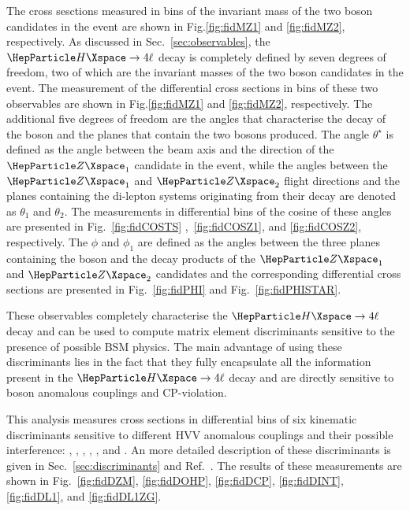 The cross sesctions measured in bins of the invariant mass of the two \PZ boson candidates in the event are shown in Fig.\ref{fig:fidMZ1} and \ref{fig:fidMZ2}, respectively.
As discussed in Sec.~\ref{sec:observables}, the $\Hllll$ decay is completely defined by seven degrees of freedom, two of which are the invariant masses of the two \PZ boson candidates in the event. The measurement of the differential cross sections in bins of these two observables are shown in Fig.\ref{fig:fidMZ1} and \ref{fig:fidMZ2}, respectively.
The additional five degrees of freedom are the angles that characterise the decay of the \PH boson and the planes that contain the two \PZ bosons produced. 
The angle $\theta^\star$ is defined as the angle between the beam axis and the direction of the $\PZ_1$ candidate in the event, while the angles between the $\PZ_1$ and $\PZ_2$ flight directions and the planes containing the di-lepton systems originating from their decay are denoted as  $\theta_1$ and $\theta_2$.
The measurements in differential bins of the cosine of these angles are presented in Fig.~\ref{fig:fidCOSTS} ,~\ref{fig:fidCOSZ1}, and \ref{fig:fidCOSZ2}, respectively.
The $\phi$ and $\phi_1$ are defined as the angles between the three planes containing the \PH boson and the decay products of the $\PZ_1$ and $\PZ_2$ candidates and the corresponding differential cross sections are presented in Fig.~\ref{fig:fidPHI} and Fig.~\ref{fig:fidPHISTAR}. 

These observables completely characterise the $\Hllll$ decay and can be used to compute matrix element discriminants sensitive to the presence of possible BSM physics. The main advantage of using these discriminants lies in the fact that they fully encapsulate all the information present in the $\Hllll$ decay and are directly sensitive to \PH boson anomalous couplings and CP-violation.

This analysis measures cross sections in differential bins of six kinematic discriminants sensitive to different HVV anomalous couplings and their possible interference: \Dzm, \Dzhp, \DCP, \Dint, \DLone, and \DLoneZg. An more detailed description of these discriminants is given in Sec.~\ref{sec:discriminants} and Ref.~\cite{CMSHIG19009}.
The results of these measurements are shown in Fig.~\ref{fig:fidDZM}, \ref{fig:fidDOHP}, \ref{fig:fidDCP}, \ref{fig:fidDINT}, \ref{fig:fidDL1}, and \ref{fig:fidDL1ZG}.

\clearpage

